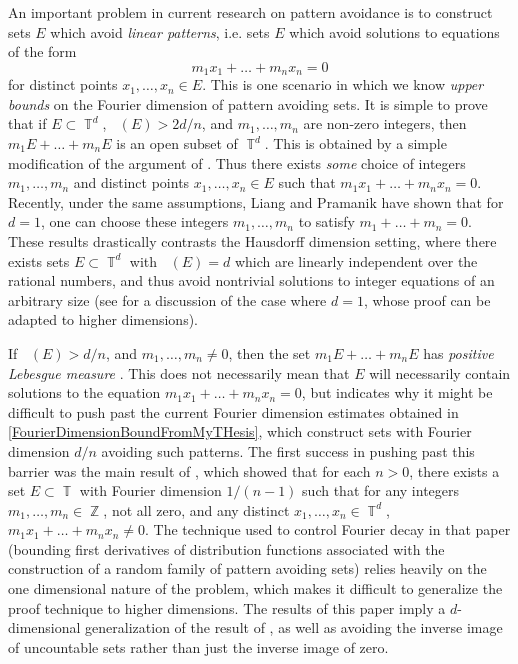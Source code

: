 \documentclass[dvipsnames,letterpaper,12pt]{article}
\numberwithin{equation}{section}
\DeclareMathOperator{\hausdim}{\dim_{\mathbb{H}}}
\DeclareMathOperator{\fordim}{\dim_{\mathbb{F}}}
\DeclareMathOperator{\ZZ}{\mathbb{Z}}
\DeclareMathOperator{\TT}{\mathbb{T}}
\numberwithin{theorem}{section}
\begin{document}
An important problem in current research on pattern avoidance is to construct sets $E$ which avoid \emph{linear patterns}, i.e. sets $E$ which avoid solutions to equations of the form
%
\begin{equation}
    m_1x_1 + \dots + m_nx_n = 0
\end{equation}
%
for distinct points $x_1,\dots,x_n \in E$.
%
%
This is one scenario in which we know \emph{upper bounds} on the Fourier dimension of pattern avoiding sets. It is simple to prove that if $E \subset \TT^d$, $\fordim(E) > 2d/n$, and $m_1,\dots,m_n$ are non-zero integers, then $m_1 E + \dots + m_n E$ is an open subset of $\TT^d$. This is obtained by a simple modification of the argument of \cite[Proposition 3.14]{MattilaFourier}. Thus there exists \emph{some} choice of integers $m_1,\dots,m_n$ and distinct points $x_1,\dots,x_n \in E$ such that $m_1x_1 + \dots + m_nx_n = 0$. Recently, under the same assumptions, Liang and Pramanik \cite{LiangPramanik} have shown that for $d = 1$, one can choose these integers $m_1,\dots,m_n$ to satisfy $m_1 + \dots + m_n = 0$. These results drastically contrasts the Hausdorff dimension setting, where there exists sets $E \subset \TT^d$ with $\hausdim(E) = d$ which are linearly independent over the rational numbers, and thus avoid nontrivial solutions to integer equations of an arbitrary size (see \cite{Keleti} for a discussion of the case where $d = 1$, whose proof can be adapted to higher dimensions).

If $\fordim(E) > d/n$, and $m_1,\dots,m_n \neq 0$, then the set $m_1 E + \dots + m_n E$ has \emph{positive Lebesgue measure} \cite[Proposition 3.14]{MattilaFourier}. This does not necessarily mean that $E$ will necessarily contain solutions to the equation $m_1x_1 + \dots + m_nx_n = 0$, but indicates why it might be difficult to  push past the current Fourier dimension estimates obtained in \eqref{FourierDimensionBoundFromMyTHesis}, which construct sets with Fourier dimension $d/n$ avoiding such patterns. The first success in pushing past this barrier was the main result of \cite{Korner2}, which showed that for each $n > 0$, there exists a set $E \subset \TT$ with Fourier dimension $1/(n-1)$ such that for any integers $m_1,\dots,m_n \in \ZZ$, not all zero, and any distinct $x_1,\dots,x_n \in \TT^d$, $m_1x_1 + \dots + m_nx_n \neq 0$. The technique used to control Fourier decay in that paper (bounding first derivatives of distribution functions associated with the construction of a random family of pattern avoiding sets) relies heavily on the one dimensional nature of the problem, which makes it difficult to generalize the proof technique to higher dimensions. The results of this paper imply a $d$-dimensional generalization of the result of \cite{Korner2}, as well as avoiding the inverse image of uncountable sets rather than just the inverse image of zero.
\end{document}
